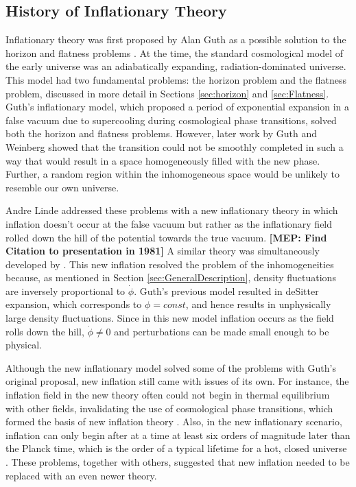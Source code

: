 \documentclass[a4paper,11pt]{article}
\newcommand{\mep}[1]{{\color{applegreen} \textbf{[MEP:  #1]}}}
\begin{document}
\subsection{History of Inflationary Theory}
\label{sec:History}
Inflationary theory was first proposed by Alan Guth as a possible solution to the horizon and flatness problems \citep{Guth1981}. At the time, the standard cosmological model of the early universe was an adiabatically expanding, radiation-dominated universe. This model had two fundamental problems: the horizon problem and the flatness problem, discussed in more detail in Sections \ref{sec:horizon} and \ref{sec:Flatness}. Guth's inflationary model, which proposed a period of exponential expansion in a false vacuum due to supercooling during cosmological phase transitions, solved both the horizon and flatness problems.  However, later work by Guth and Weinberg \citep{Guth+Weinberg1983} showed that the transition could not be smoothly completed in such a way that would result in a space homogeneously filled with the new phase. Further, a random region within the inhomogeneous space would be unlikely to resemble our own universe. 

Andre Linde addressed these problems with a new inflationary theory in which inflation doesn't occur at the false vacuum but rather as the inflationary field rolled down the hill of the potential towards the true vacuum. \mep{Find Citation to presentation in 1981} A similar theory was simultaneously developed by \citet{Albrecht+Steinhardt1982}. This new inflation resolved the problem of the inhomogeneities because, as mentioned in Section \ref{sec:GeneralDescription}, density fluctuations are inversely proportional to $\dot \phi$. Guth's previous model resulted in deSitter expansion, which corresponds to $\phi=const$, and hence results in unphysically large density fluctuations. Since in this new model inflation occurs as the field rolls down the hill, $\dot \phi \neq 0$ and perturbations can be made small enough to be physical. 

Although the new inflationary model solved some of the problems with Guth's original proposal, new inflation still came with issues of its own. For instance, the inflation field in the new theory often could not begin in thermal equilibrium with other fields, invalidating the use of cosmological phase transitions, which formed the basis of new inflation theory \citep{Linde2000}. Also, in the new inflationary scenario, inflation can only begin after at a time at least six orders of magnitude later than the Planck time, which is the order of a typical lifetime for a hot, closed universe \citep{LindeBook2005}. These problems, together with others, suggested that new inflation needed to be replaced with an even newer theory. 
\end{document}

